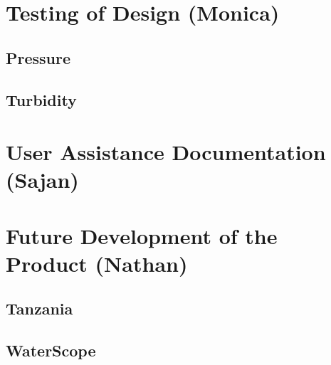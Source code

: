 \documentclass[12pt]{article}
\begin{document}
\section{Testing of Design (Monica)}

\subsection{Pressure}

\subsection{Turbidity}

\section{User Assistance Documentation (Sajan)}

\section{Future Development of the Product (Nathan)}

\subsection{Tanzania}

\subsection{WaterScope}
\end{document}
